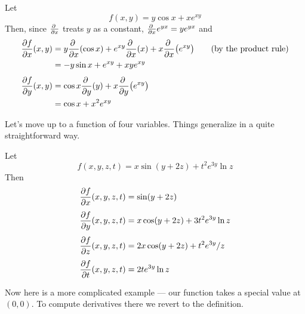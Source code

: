 \begin{eg}\label{eg partials B}
Let
\begin{equation*}
f(x,y) = y\cos x + xe^{xy}
\end{equation*}
Then, since $\pdiff{}{x}$ treats $y$ as a constant,
$\pdiff{}{x} e^{yx}=y e^{yx}$ and
\begin{align*}
\pdiff{f}{x}(x,y) &= y\pdiff{}{x}(\cos x) + e^{xy}\pdiff{}{x}(x) 
                         +x\pdiff{}{x}\big(e^{xy}\big)
                         \qquad\text{(by the product rule)} \\
                  &= -y\sin x + e^{xy} +xye^{xy} \\[0.05in]
\pdiff{f}{y}(x,y) &= \cos x\pdiff{}{y}(y) + x\pdiff{}{y}\big(e^{xy}\big) \\
                  &= \cos x + x^2e^{xy}
\end{align*}
\end{eg}
Let's move up to a function of four variables. Things generalize
in a quite straightforward way. 
\begin{eg}\label{eg partials C}
Let
\begin{equation*}
f(x,y,z,t) = x\sin(y+2z) +t^2e^{3y}\ln z
\end{equation*}
Then
\begin{align*}
\pdiff{f}{x}(x,y,z,t) &= \sin(y+2z)  \\[0.05in]
\pdiff{f}{y}(x,y,z,t) &= x\cos(y+2z) +3t^2e^{3y}\ln z \\[0.05in]
\pdiff{f}{z}(x,y,z,t) &= 2x\cos(y+2z) +t^2e^{3y}/z \\[0.05in]
\pdiff{f}{t}(x,y,z,t) &= 2te^{3y}\ln z 
\end{align*}
\end{eg}
Now here is a more complicated example --- our function takes a special
value at $(0,0)$. To compute derivatives there we revert to
the definition.
